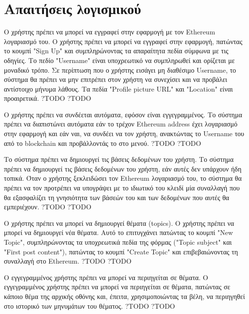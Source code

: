 \section{Απαιτήσεις λογισμικού} \label{section:3-3-requirements}

\begin{enumerate}[label=\textbf{<ΛΑ-\arabic*>}, leftmargin=\parindent, align=left, labelwidth=\parindent, labelsep=0pt]
	\sysReqItem
		{Ο χρήστης πρέπει να μπορεί να εγγραφεί στην εφαρμογή με τον Ethereum λογαριασμό του.}
		{Ο χρήστης πρέπει να μπορεί να εγγραφεί στην εφαρμογή, πατώντας το κουμπί "Sign Up" και συμπληρώνοντας τα απαραίτητα πεδία σύμφωνα με τις οδηγίες. Το πεδίο "Username" είναι υποχρεωτικό να συμπληρωθεί και ορίζεται με μοναδικό τρόπο. Σε περίπτωση που ο χρήστης εισάγει μη διαθέσιμο Username, το σύστημα θα πρέπει να μην επιτρέπει στον χρήστη να συνεχίσει και να προβάλει αντίστοιχο μήνυμα λάθους. Τα πεδία "Profile picture URL" και "Location" είναι προαιρετικά.}
		{?}{TODO}
		{?}{TODO}

	\sysReqItem
		{Ο χρήστης πρέπει να συνδέεται αυτόματα, εφόσον είναι εγγεγραμμένος.}
		{Το σύστημα πρέπει να διαπιστώνει αυτόματα εάν το τρέχον Ethereum address έχει λογαριασμό στην εφαρμογή και εάν ναι, να συνδέει να τον χρήστη, ανακτώντας το Username του από το blockchain και προβάλλοντάς το στο μενού.}
		{?}{TODO}
		{?}{TODO}

	\sysReqItem
		{Το σύστημα πρέπει να δημιουργεί τις βάσεις δεδομένων του χρήστη.}
		{Το σύστημα πρέπει να δημιουργεί τις βάσεις δεδομένων του χρήστη, εάν αυτές δεν υπάρχουν ήδη τοπικά. Όταν ο χρήστης ξεκλειδώσει τον Ethereum λογαριασμό του, το σύστημα θα πρέπει να τον προτρέπει να υπογράψει με το ιδιωτικό του κλειδί μία συναλλαγή που θα εξασφαλίζει τη γνησιότητα των βάσεών του και των δεδομένων που αυτές θα εμπεριέχουν.}
		{?}{TODO}
		{?}{TODO}

	\sysReqItem
		{Ο χρήστης πρέπει να μπορεί να δημιουργεί θέματα (topics).}
		{Ο χρήστης πρέπει να μπορεί να δημιουργεί νέα θέματα. Αυτό το επιτυγχάνει πατώντας το κουμπί "New Topic", συμπληρώνοντας τα υποχρεωτικά πεδία της φόρμας ("Topic subject" και "First post content"), πατώντας το κουμπί "Create Topic" και επιβεβαιώνοντας τη συναλλαγή στο Ethereum.}
		{?}{TODO}
		{?}{TODO}

	\sysReqItem
		{Ο εγγεγραμμένος χρήστης πρέπει να μπορεί να περιηγείται σε θέματα.}
		{Ο εγγεγραμμένος χρήστης πρέπει να μπορεί να περιηγείται σε θέματα, πατώντας σε κάποιο θέμα της αρχικής οθόνης και, έπειτα, χρησιμοποιώντας τα βέλη, να περιηγηθεί στο ιστορικό των μηνυμάτων του θέματος.}
		{?}{TODO}
		{?}{TODO}


\end{enumerate}
